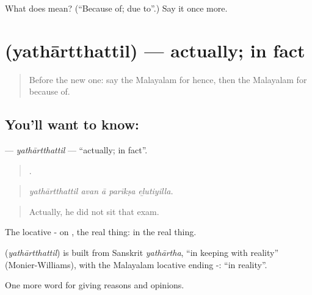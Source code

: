 \begin{tcolorbox}[breakable,colback=teal!4,colframe=teal!35!black,title={Before you move on}]
What does  mean? (\textquotedblleft{}Because of; due to\textquotedblright{}.) Say it once more.
\end{tcolorbox}
\section[\texorpdfstring{\ml{യഥാർത്ഥത്തിൽ} (yathārtthattil)}{യഥാർത്ഥത്തിൽ (yathārtthattil)}]{ (yathārtthattil) — actually; in fact}

\label{lesson:ML-C411-yathartthattil}



\begin{quote}
Before the new one: say the Malayalam for hence, then the Malayalam for because of.
\end{quote}

\subsection*{You'll want to know: }
\textbf{} — \emph{yathārtthattil} — \textquotedblleft{}actually; in fact\textquotedblright{}.

\begin{quote}
    .
\end{quote}

\begin{quote}
\emph{yathārtthattil avan ā parīkṣa eḻutiyilla.}
\end{quote}

\begin{quote}
Actually, he did not sit that exam.
\end{quote}

The locative - on , the real thing: in the real thing.

\begin{cousinweb}
\textbf{} (\emph{yathārtthattil}) is built from Sanskrit \emph{yathārtha}, \textquotedblleft{}in keeping with reality\textquotedblright{} (Monier-Williams), with the Malayalam locative ending -: \textquotedblleft{}in reality\textquotedblright{}.
\end{cousinweb}

\begin{grammarlens}[title={What you've built}]
One more word for giving reasons and opinions.
\end{grammarlens}

